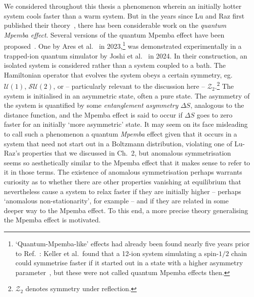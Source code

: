 \documentclass[hyperref={colorlinks=true, urlcolor=blue, citecolor=blue, final, bound}]{sfuthesis}
\begin{document}
\begin{appendices}
We considered throughout this thesis a phenomenon wherein an initially hotter system cools faster than a warm system. But in the years since Lu and Raz first published their theory~\cite{Lu2017}, there has been considerable work on the \textit{quantum Mpemba effect}. Several versions of the quantum Mpemba effect have been proposed~\cite{Teza2023,Ares2025}. One by Ares et al.~\cite{Ares2023} in 2023,\footnote{`Quantum-Mpemba-like' effects had already been found nearly five years prior to Ref.~\cite{Ares2023}: Keller et al.\ found that a 12-ion system simulating a spin-$1/2$ chain could symmetrise faster if it started out in a state with a higher asymmetry parameter~\cite{Keller2018}, but these were not called quantum Mpemba effects then.} was demonstrated experimentally in a trapped-ion quantum simulator by Joshi et al.~\cite{Joshi2024} in 2024. In their construction, an isolated system is considered rather than a system coupled to a bath. The Hamiltonian operator that evolves the system obeys a certain symmetry, eg.~$\mathcal U(1)$, $\mathcal{SU}(2)$, or -- particularly relevant to the discussion here -- $\mathcal Z_2$.\footnote{$\mathcal Z_2$ denotes symmetry under reflection.} The system is initialised in an asymmetric state, often a pure state. The asymmetry of the system is quantified by some \textit{entanglement asymmetry} $\Delta S$, analogous to the distance function, and the Mpemba effect is said to occur if $\Delta S$ goes to zero faster for an initially `more asymmetric' state. It may seem on its face misleading to call such a phenomenon a quantum \textit{Mpemba} effect given that it occurs in a system that need not start out in a Boltzmann distribution, violating one of Lu-Raz's properties that we discussed in Ch.~2, but anomalous symmetrisation seems so aesthetically similar to the Mpemba effect that it makes sense to refer to it in those terms. The existence of anomalous symmetrisation perhaps warrants curiosity as to whether there are other properties vanishing at equilibrium that nevertheless cause a system to relax faster if they are initially higher -- perhaps `anomalous non-stationarity', for example -- and if they are related in some deeper way to the Mpemba effect. To this end, a more precise theory generalising the Mpemba effect is motivated.


\end{appendices}
\end{document}
